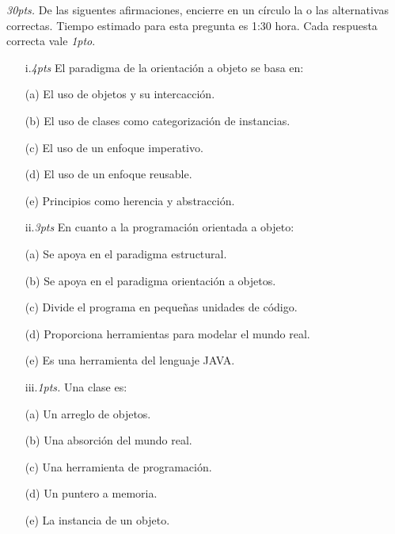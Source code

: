 \documentclass[10pt]{article}
\begin{document}
\begin{enumerate}
   {\scriptsize
    \item \emph{30pts.} De las siguentes afirmaciones, encierre en un c\'irculo la o las alternativas correctas. Tiempo estimado para esta pregunta  es 1:30 hora. Cada respuesta correcta vale \emph{1pto}.
    \begin{multicols}{2}

    \begin{enumerate}[label=(\alph*)]
        \item[i.\emph{4pts}] El paradigma de la orientaci\'on a objeto se basa en:
        \item[(a)] El uso de objetos y su intercacci\'on.
        \item[(b)] El uso de clases como categorizaci\'on de instancias.
        \item[(c)] El uso de un enfoque imperativo.
        \item[(d)] El uso de un enfoque reusable.
        \item[(e)] Principios como herencia y abstracci\'on.
    \end{enumerate}

    \begin{enumerate}[label=(\alph*)]
        \item[ii.\emph{3pts}] En cuanto a la programaci\'on orientada a objeto:
        \item[(a)] Se apoya en el paradigma estructural.
        \item[(b)] Se apoya en el paradigma orientaci\'on a objetos.
        \item[(c)] Divide el programa en peque\~nas unidades de c\'odigo.
        \item[(d)] Proporciona herramientas para modelar el mundo real.
        \item[(e)] Es una herramienta del lenguaje JAVA.
    \end{enumerate}

    \begin{enumerate}[label=(\alph*)]
        \item[iii.\emph{1pts.}] Una clase es:
        \item[(a)] Un arreglo de objetos.
        \item[(b)] Una absorci\'on del mundo real.
        \item[(c)] Una herramienta de programaci\'on.
        \item[(d)] Un puntero a memoria.
        \item[(e)] La instancia de un objeto.
    \end{enumerate}


\end{multicols}}
\end{enumerate}
\end{document}
